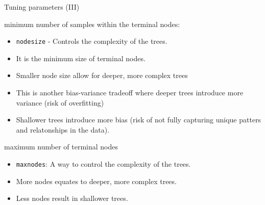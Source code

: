 \documentclass[
  10pt,
  ignorenonframetext,
]{beamer}
\providecommand{\tightlist}{%
  \setlength{\itemsep}{0pt}\setlength{\parskip}{0pt}}
\begin{document}
\begin{frame}[fragile]{Tuning parameters (III)}
\protect\hypertarget{tuning-parameters-iii}{}

\begin{block}{minimum number of samples within the terminal nodes:}

\begin{itemize}
\tightlist
\item
  \texttt{nodesize} - Controls the complexity of the trees.
\item
  It is the minimum size of terminal nodes.
\item
  Smaller node size allow for deeper, more complex trees
\item
  This is another bias-variance tradeoff where deeper trees introduce
  more variance (risk of overfitting)
\item
  Shallower trees introduce more bias (risk of not fully capturing
  unique patters and relatonships in the data).
\end{itemize}

\end{block}

\begin{block}{maximum number of terminal nodes}

\begin{itemize}
\tightlist
\item
  \texttt{maxnodes}: A way to control the complexity of the trees.
\item
  More nodes equates to deeper, more complex trees.
\item
  Less nodes result in shallower trees.
\end{itemize}

\end{block}

\end{frame}
\end{document}
